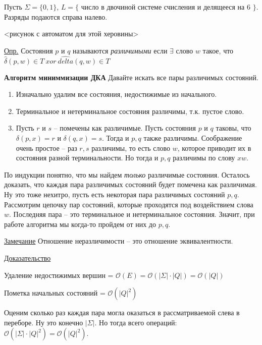 \documentclass[fleqn, 12pt]{article}
\newcommand{\bigo}{\mathcal{O}}
\newenvironment{myindentpar}[1]%
{\begin{list}{}%
		{\setlength{\leftmargin}{#1}}%
		\item[]
	}
	{\end{list}}
\begin{document}
\bigskip


Пусть $ \Sigma = \{0, 1\} $, $ L = \{$ число в двочиной системе счисления и делящееся на $ 6 $ $\} $. Разряды подаются справа налево.

<рисунок с автоматом для этой херовины>

\underline{Опр.} Состояния $ p $ и $ q $ называются \textit{различимыми} если $ \exists $ слово $ w $ такое, что $ \hat{\delta}(p, w) \in T\ xor\ \hat{delta}(q, w) \in T $


\bigskip



\textbf{Алгоритм миниммизации ДКА}
Давайте искать все пары различимых состояний. 

\begin{enumerate}
	\item Изначально удалим все состояния, недостижимые из начального.
	
	\item Терминальное и нетерминальное состояния различимы, т.к. пустое слово.
	
	\item Пусть $ r $ и $ s $ -- помечены как различимые. Пусть состояния $ p $ и $ q $ таковы, что $ \delta(p, x) = r $ и $ \delta(q, x) = s $. Тогда и $ p, q $ также различимы. Соображение очень простое -- раз $ r,s $ различимы, то есть слово $ w $, которое приводит их в состояния разной терминальности. Но тогда и $ p, q $ различимы по слову $ xw $.
	
\end{enumerate}

По индукции понятно, что мы найдем \textit{только} различимые состояния. Осталось доказать, что каждая пара различимых состояний будет помечена как различимая. Ну это тоже нехитро, пусть есть некоторая пара различимых состояний $ p,q  $. Рассмотрим цепочку пар состояний, которые проходятся под воздействием слова $ w $. Последняя пара -- это терминальное и нетерминальное состояния. Значит, при работе алгоритма мы когда-то пройдем от них до $ p, q $. 

\underline{Замечание} Отношение неразличимости -- это отношение эквивалентности. 

\underline{Доказательство}

\begin{myindentpar}{0.5cm}
	Удаление недостижимых вершин = $ \bigo(E) = \bigo(|\Sigma| \cdot |Q|) = \bigo(|Q|) $
	
	Пометка начальных состояний = $ \bigo(|Q|^2) $
	
	Оценим сколько раз каждая пара могла оказаться в рассматриваемой слева в переборе. Ну это конечно $ |\Sigma| $. Но тогда всего операций: $ \bigo (|\Sigma| \cdot |Q|^2) = \bigo(|Q|^2) $.
	
\end{myindentpar}
\end{document}
